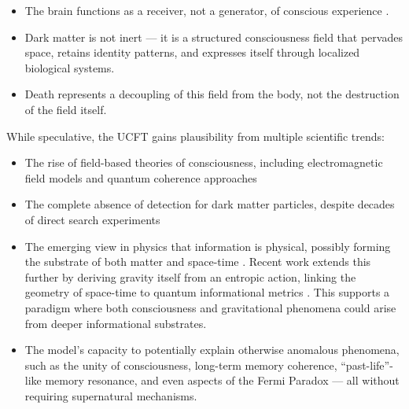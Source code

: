 \documentclass[titlepage]{article}
\begin{document}
\begin{itemize}
\item The brain functions as a receiver, not a generator, of conscious experience \parencite{huxley1954doors, pribram1991brain}.
\item Dark matter is not inert — it is a structured consciousness field that pervades space, retains identity patterns, and expresses itself through localized biological systems.
\item Death represents a decoupling of this field from the body, not the destruction of the field itself.
\end{itemize}

While speculative, the UCFT gains plausibility from multiple scientific trends:

\begin{itemize}
\item The rise of field-based theories of consciousness, including electromagnetic field models and quantum coherence approaches \parencite{mcfadden2020electromagnetic, penrose1996orchestrated}
\item The complete absence of detection for dark matter particles, despite decades of direct search experiments \parencite{bertone2005particle}
\item The emerging view in physics that information is physical, possibly forming the substrate of both matter and space-time \parencite{landauer1991information, lloyd2006programming}. Recent work extends this further by deriving gravity itself from an entropic action, linking the geometry of space-time to quantum informational metrics \parencite{Bianconi2025Gravity}. This supports a paradigm where both consciousness and gravitational phenomena could arise from deeper informational substrates.
\item The model’s capacity to potentially explain otherwise anomalous phenomena, such as the unity of consciousness, long-term memory coherence, “past-life”-like memory resonance, and even aspects of the Fermi Paradox — all without requiring supernatural mechanisms.
\end{itemize}
\end{document}

